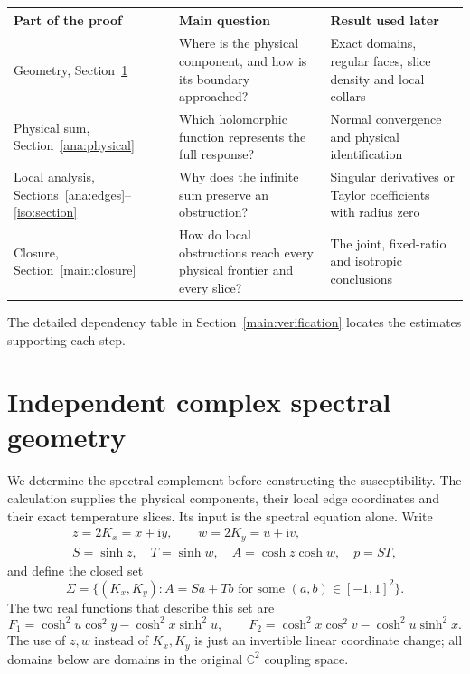 \documentclass[11pt]{article}
\numberwithin{equation}{section}
\theoremstyle{definition}
\newcommand{\C}{\mathbb C}
\newcommand{\ii}{\mathrm i}
\begin{document}
\begin{center}
\small
\begin{tabular}{@{}>{\raggedright\arraybackslash}p{}>{\raggedright\arraybackslash}p{}>{\raggedright\arraybackslash}p{}@{}}
\toprule
Part of the proof & Main question & Result used later\\
\midrule
Geometry, Section~\ref{geo:section} & Where is the physical component,
and how is its boundary approached? & Exact domains, regular faces,
slice density and local collars\\[3pt]
Physical sum, Section~\ref{ana:physical} & Which holomorphic function
represents the full response? & Normal convergence and physical identification\\[3pt]
Local analysis, Sections~\ref{ana:edges}--\ref{iso:section} & Why does
the infinite sum preserve an obstruction? & Singular derivatives or
Taylor coefficients with radius zero\\[3pt]
Closure, Section~\ref{main:closure} & How do local obstructions reach
every physical frontier and every slice? & The joint, fixed-ratio and
isotropic conclusions\\
\bottomrule
\end{tabular}
\end{center}
The detailed dependency table in Section~\ref{main:verification}
locates the estimates supporting each step.

\clearpage
\tableofcontents
\clearpage

\section{Independent complex spectral geometry}
\label{geo:section}

We determine the spectral complement before constructing the
susceptibility. The calculation supplies the physical components, their
local edge coordinates and their exact temperature slices. Its input
is the spectral equation alone. Write
\[
 \begin{gathered}
 z=2K_x=x+\ii y,\qquad w=2K_y=u+\ii v,\\
 S=\sinh z,\quad T=\sinh w,\quad A=\cosh z\cosh w,\quad p=ST,
 \end{gathered}
\]
and define the closed set
\begin{equation}\label{geo:sigma}
 \Sigma=\{(K_x,K_y):A=S a+T b
                    \text{ for some }(a,b)\in[-1,1]^2\}.
\end{equation}
The two real functions that describe this set are
\begin{equation}\label{geo:F}
 F_1=\cosh^2u\cos^2y-\cosh^2x\sinh^2u,\qquad
 F_2=\cosh^2x\cos^2v-\cosh^2u\sinh^2x.
\end{equation}
The use of \(z,w\) instead of \(K_x,K_y\) is just an invertible linear
coordinate change; all domains below are domains in the original
\(\C^2\) coupling space.
\end{document}

